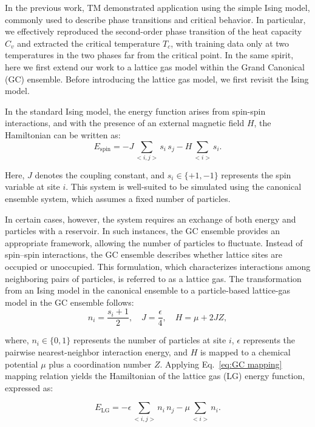 \documentclass[aip,jcp,reprint,longbibliography]{revtex4-1}
\begin{document}
In the previous work, TM demonstrated application using the simple Ising model, commonly used to describe phase transitions and critical behavior. In particular, we effectively reproduced the second-order phase transition of the heat capacity $C_v$ and extracted the critical temperature $T_c$, with training data only at two temperatures in the two phases far from the critical point. In the same spirit, here we first extend our work to a lattice gas model within the Grand Canonical (GC) ensemble. Before introducing the lattice gas model, we first revisit the Ising model. 


In the standard Ising model, the energy function arises from spin-spin interactions, and with the presence of an  external magnetic field $H$, the Hamiltonian can be written as: 
\begin{equation}
    E_\text{spin} = -J \sum_{<i,j>} s_i \,s_j -H \sum_{<i>} s_i.
\end{equation}

\noindent Here, $ J $ denotes the coupling constant, and $ s_i \in \{+1, -1\} $ represents the spin variable at site $ i $. This system is well-suited to be simulated using the canonical ensemble system, which assumes a fixed number of particles. 

In certain cases, however, the system requires an exchange of both energy and particles with a reservoir. In such instances, the GC ensemble provides an appropriate framework, allowing the number of particles to fluctuate.\cite{lee1952statistical} Instead of spin–spin interactions, the GC ensemble describes whether lattice sites are occupied or unoccupied. This formulation, which characterizes interactions among neighboring pairs of particles, is referred to as a lattice gas. The transformation from an Ising model in the canonical ensemble to a particle-based lattice-gas model in the GC ensemble follows:
\begin{equation}
n_i = \frac{s_i + 1}{2}, \quad J = \frac{\epsilon}{4}, \quad H = \mu + 2JZ ,
\label{eq:GC mapping}
\end{equation}


\noindent where, $n_i \in \{0, 1\} $ represents the number of particles at site $i$, $\epsilon$ represents the pairwise nearest-neighbor interaction energy, and  $H$ is mapped to a chemical potential $\mu$ plus a coordination number $Z$. Applying Eq.~\ref{eq:GC mapping} mapping relation yields the Hamiltonian of the lattice gas (LG) energy function, expressed as:

\begin{equation}
    E_\text{LG} = -\epsilon \sum_{<i,j>} n_i \,n_j -\mu\sum_{<i>} n_i.
\end{equation}
\end{document}
